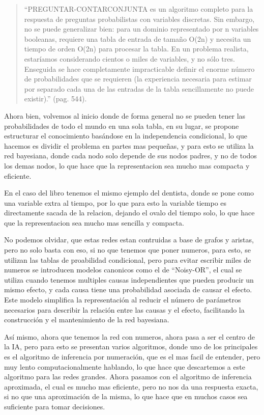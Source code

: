\documentclass[letterpaper,12pt]{article}
\begin{document}
\begin{quote}
    ``PREGUNTAR-CONTARCONJUNTA
es un algoritmo completo para la respuesta de preguntas probabilistas con variables
discretas. Sin embargo, no se puede generalizar bien: para un dominio representado
por n variables booleanas, requiere una tabla de entrada de tamaño O(2n) y necesita un
tiempo de orden O(2n) para procesar la tabla. En un problema realista, estaríamos
considerando cientos o miles de variables, y no sólo tres. Enseguida se hace completamente
impracticable definir el enorme número de probabilidades que se requieren (la experiencia
necesaria para estimar por separado cada una de las entradas de la tabla
sencillamente no puede existir).'' (pag. 544).
\end{quote}

Ahora bien, volvemos al inicio donde de forma general no se pueden tener las probabilidades de todo el mundo en una sola tabla, en su lugar, se propone estructurar el conocimiento basándose en la independencia condicional, lo que hacemos es dividir el problema en partes mas pequeñas, y para esto se utiliza la red bayesiana, donde cada nodo solo depende de sus nodos padres, y no de todos los demas nodos, lo que hace que la representacion sea mucho mas compacta y eficiente.

En el caso del libro tenemos el mismo ejemplo del dentista, donde se pone como una variable extra al tiempo, por lo que para esto la variable tiempo es directamente sacada de la relacion, dejando el ovalo del tiempo solo, lo que hace que la representacion sea mucho mas sencilla y compacta.

No podemos olvidar, que estas redes estan contruidas a base de grafos y aristas, pero no solo basta con eso, si no que tenemos que poner numeros, para esto, se utilizan las tablas de proabilidad condicional, pero para evitar escribir miles de numeros se introducen modelos canonicos como el de ``Noisy-OR'', el cual se utiliza cuando tenemos multiples causas independientes que pueden producir un mismo efecto, y cada causa tiene una probabilidad asociada de causar el efecto.  Este modelo simplifica la representación al reducir el número de parámetros necesarios para describir la relación entre las causas y el efecto, facilitando la construcción y el mantenimiento de la red bayesiana.

Así mismo, ahora que tenemos la red con numeros, ahora pasa a ser el centro de la IA, pero para esto se presentan varios algoritmos, donde uno de los principales es el algoritmo de inferencia por numeración, que es el mas facil de entender, pero muy lento computacionalmente hablando, lo que hace que descartemos a este algoritmo para las redes grandes.
Ahora pasamos con el algoritmo de inferencia aproximada, el cual es mucho mas eficiente, pero no nos da una respuesta exacta, si no que una aproximación de la misma, lo que hace que en muchos casos sea suficiente para tomar decisiones.
\end{document}
